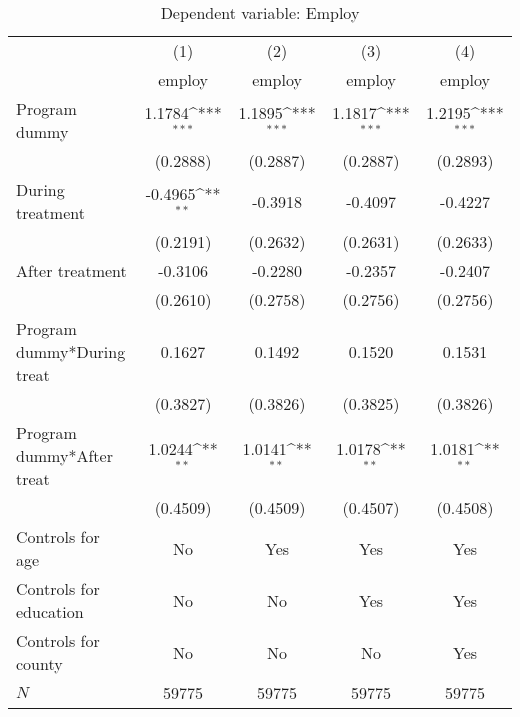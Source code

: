 \begin{table}[htbp]\centering
\def\sym#1{\ifmmode^{#1}\else\(^{#1}\)\fi}
\caption{Dependent variable: Employ}
\begin{tabular}{l*{4}{c}}
\hline\hline
            &\multicolumn{1}{c}{(1)}&\multicolumn{1}{c}{(2)}&\multicolumn{1}{c}{(3)}&\multicolumn{1}{c}{(4)}\\
            &\multicolumn{1}{c}{employ}&\multicolumn{1}{c}{employ}&\multicolumn{1}{c}{employ}&\multicolumn{1}{c}{employ}\\
\hline
Program dummy&      1.1784\sym{***}&      1.1895\sym{***}&      1.1817\sym{***}&      1.2195\sym{***}\\
            &    (0.2888)         &    (0.2887)         &    (0.2887)         &    (0.2893)         \\
[1em]
During treatment&     -0.4965\sym{**} &     -0.3918         &     -0.4097         &     -0.4227         \\
            &    (0.2191)         &    (0.2632)         &    (0.2631)         &    (0.2633)         \\
[1em]
After treatment&     -0.3106         &     -0.2280         &     -0.2357         &     -0.2407         \\
            &    (0.2610)         &    (0.2758)         &    (0.2756)         &    (0.2756)         \\
[1em]
Program dummy*During treat&      0.1627         &      0.1492         &      0.1520         &      0.1531         \\
            &    (0.3827)         &    (0.3826)         &    (0.3825)         &    (0.3826)         \\
[1em]
Program dummy*After treat&      1.0244\sym{**} &      1.0141\sym{**} &      1.0178\sym{**} &      1.0181\sym{**} \\
            &    (0.4509)         &    (0.4509)         &    (0.4507)         &    (0.4508)         \\
[1em]
Controls for age &          No         &         Yes         &         Yes         &         Yes         \\
[1em]
Controls for education &          No         &          No         &         Yes         &         Yes         \\
[1em]
Controls for county &          No         &          No         &          No         &         Yes         \\
\hline
\(N\)       &       59775         &       59775         &       59775         &       59775         \\

\end{tabular}
\end{table}

